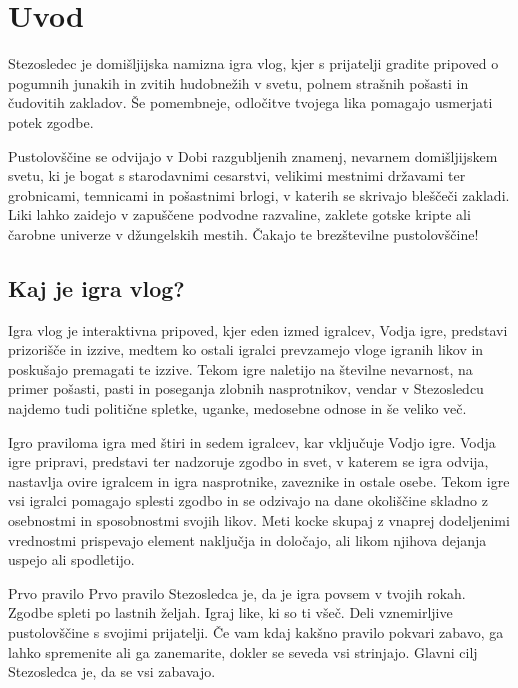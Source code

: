 \chapter{Uvod}

Stezosledec je domišljijska namizna igra vlog, kjer s prijatelji gradite pripoved o pogumnih junakih in zvitih hudobnežih v svetu, polnem strašnih pošasti in čudovitih zakladov. Še pomembneje, odločitve tvojega lika pomagajo usmerjati potek zgodbe.

Pustolovščine se odvijajo v Dobi razgubljenih znamenj, nevarnem domišljijskem svetu, ki je bogat s starodavnimi cesarstvi, velikimi mestnimi državami ter grobnicami, temnicami in pošastnimi brlogi, v katerih se skrivajo bleščeči zakladi. Liki lahko zaidejo v zapuščene podvodne razvaline, zaklete gotske kripte ali čarobne univerze v džungelskih mestih. Čakajo te brezštevilne pustolovščine!

\section{Kaj je igra vlog?}

Igra vlog je interaktivna pripoved, kjer eden izmed igralcev, Vodja igre, predstavi prizorišče in izzive, medtem ko ostali igralci prevzamejo vloge igranih likov in poskušajo premagati te izzive. Tekom igre naletijo na številne nevarnost, na primer pošasti, pasti in poseganja zlobnih nasprotnikov, vendar v Stezosledcu najdemo tudi politične spletke, uganke, medosebne odnose in še veliko več.

Igro praviloma igra med štiri in sedem igralcev, kar vključuje Vodjo igre. Vodja igre pripravi, predstavi ter nadzoruje zgodbo in svet, v katerem se igra odvija, nastavlja ovire igralcem in igra nasprotnike, zaveznike in ostale osebe. Tekom igre vsi igralci pomagajo splesti zgodbo in se odzivajo na dane okoliščine skladno z osebnostmi in sposobnostmi svojih likov. Meti kocke skupaj z vnaprej dodeljenimi vrednostmi prispevajo element naključja in določajo, ali likom njihova dejanja uspejo ali spodletijo.

\begin{rpg-titlebox}{Prvo pravilo}
    Prvo pravilo Stezosledca je, da je igra povsem v tvojih rokah. Zgodbe spleti po lastnih željah. Igraj like, ki so ti všeč. Deli vznemirljive pustolovščine s svojimi prijatelji. Če vam kdaj kakšno pravilo pokvari zabavo, ga lahko spremenite ali ga zanemarite, dokler se seveda vsi strinjajo. Glavni cilj Stezosledca je, da se vsi zabavajo.
\end{rpg-titlebox}

